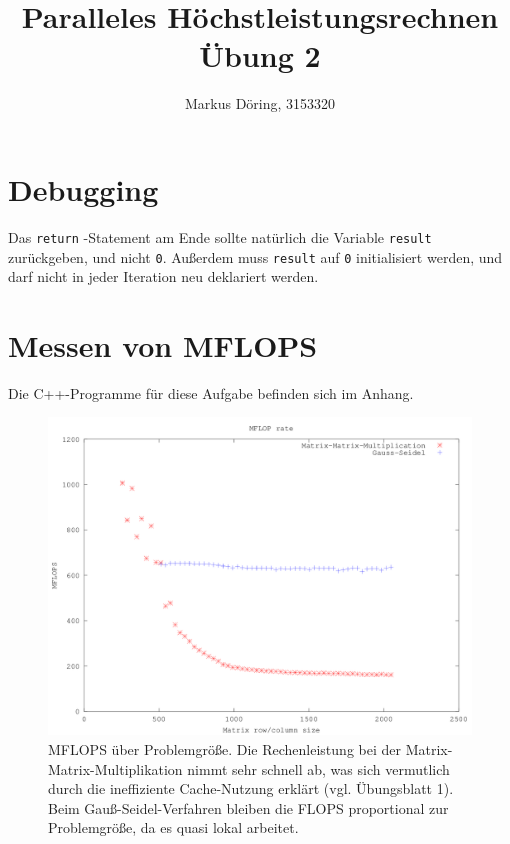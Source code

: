 \documentclass[11pt,a4paper]{scrartcl}
\begin{document}
\title{Paralleles Höchstleistungsrechnen Übung 2}
\author{Markus Döring, 3153320}
\maketitle

\setcounter{section}{2}
\section{Debugging}
Das \lstinline !return! -Statement am Ende sollte natürlich die Variable \lstinline!result! zurückgeben, und nicht \lstinline!0!. 
Außerdem muss \lstinline!result! auf \lstinline!0! initialisiert werden, und darf nicht in jeder Iteration neu deklariert werden. 


\newpage
\section{Messen von MFLOPS}
Die C++-Programme für diese Aufgabe befinden sich im Anhang.
\begin{figure}[ht]
\centering
 \includegraphics[width=.85\linewidth]{mflops.png}
 \caption{MFLOPS über Problemgröße. Die Rechenleistung bei der Matrix-Matrix-Multiplikation nimmt sehr schnell ab, was sich vermutlich durch die ineffiziente Cache-Nutzung erklärt (vgl. Übungsblatt 1). 
 Beim Gauß-Seidel-Verfahren bleiben die FLOPS proportional zur Problemgröße, da es quasi lokal arbeitet.}
 \label{fig:mflops}
\end{figure}
\end{document}
